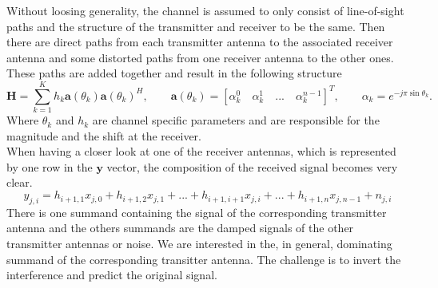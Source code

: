 \documentclass[oneside]{msvreport}%
\newcommand{\B}[1]{\boldsymbol{#1}}
\begin{document}
\begin{center}
\end{center}

\noindent Without loosing generality, the channel is assumed to only consist of line-of-sight paths and the structure of the transmitter and receiver to be the same. Then there are direct paths from each transmitter antenna to the associated receiver antenna and some distorted paths from one receiver antenna to the other ones. These paths are added together and result in the following structure
\begin{equation}
	\B{H} = \sum_{k = 1}^K h_k \B{a}(\theta_k)\B{a}(\theta_k)^H, \qquad \B{a}(\theta_k) = [\alpha_k^0 \quad \alpha_k^1 \quad ... \quad \alpha_k^{n-1}]^T, \qquad \alpha_k = e^{-j\pi \sin{\theta_k}}.
\end{equation}
Where $\theta_k$ and $h_k$ are channel specific parameters and are responsible for the magnitude and the shift at the receiver.\\ When having a closer look at one of the receiver antennas, which is represented by one row in the $\B{y}$ vector, the composition of the received signal becomes very clear. 
\begin{equation}
  y_{j,i} = h_{i + 1 , 1} x_{j,0} + h_{i + 1, 2} x_{j,1} + ... + h_{i + 1, i + 1} x_{j,i} + ... + h_{i + 1, n} x_{j, n-1} + n_{j, i}
\end{equation}
There is one summand containing the signal of the corresponding transmitter antenna and the others summands are the damped signals of the other transmitter antennas or noise. We are interested in the, in general, dominating summand of the corresponding transitter antenna. The challenge is to invert the interference and predict the original signal.
\end{document}
